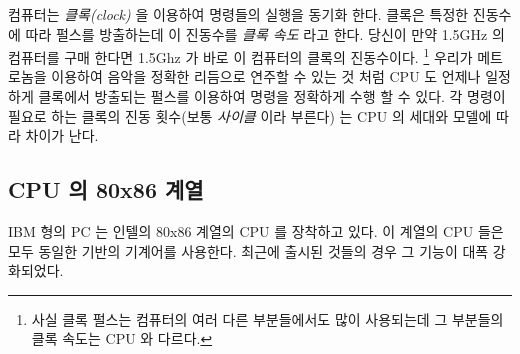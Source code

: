 컴퓨터는 \emph{클록(clock)}  을 이용하여  명령들의 실행을 동기화 한다.
클록은 특정한 진동수에 따라 펄스를 방출하는데 이 진동수를 \emph{클록 속도} 라고 한다. 당신이 만약 1.5GHz 의 컴퓨터를 
구매 한다면 1.5Ghz 가 바로 이 컴퓨터의 클록의 진동수이다. \footnote{사실 클록 펄스는 컴퓨터의 여러 다른 부분들에서도
많이 사용되는데 그 부분들의 클록 속도는 CPU 와 다르다.} 우리가 메트로놈을 이용하여 음악을 정확한 리듬으로 연주할 
수 있는 것 처럼 CPU 도 언제나 일정하게 클록에서 방출되는 펄스를 이용하여 명령을 정확하게 수행 할 수 있다. 각 명령이
필요로 하는 클록의 진동 횟수(보통 \emph{사이클} 이라 부른다) 는 CPU 의 세대와 모델에 따라 차이가 난다. 


\subsection{CPU 의 80x86 계열 }

IBM 형의 PC 는 인텔의 80x86 계열의 CPU 를 장착하고 있다. 이 계열의 CPU 들은 모두 동일한 기반의 기계어를 사용한다. 
최근에 출시된 것들의 경우 그 기능이 대폭 강화되었다. 

